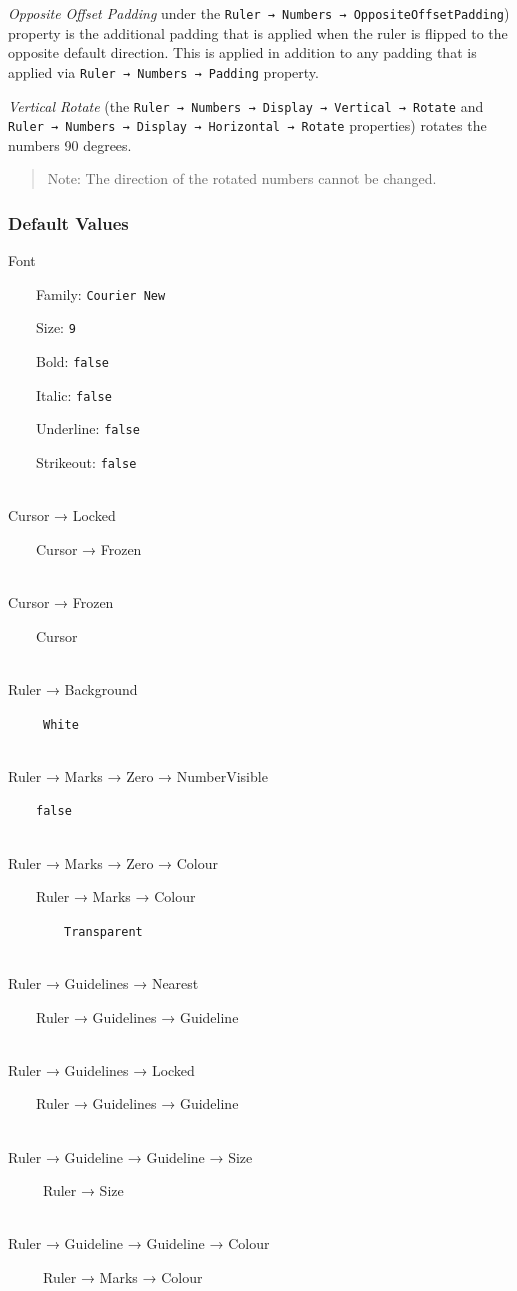 \documentclass[
]{book}
\begin{document}
\emph{Opposite Offset Padding} under the \texttt{Ruler\ →\ Numbers\ →\ OppositeOffsetPadding}) property is the additional padding that is applied when the ruler is flipped to the opposite default direction.
This is applied in addition to any padding that is applied via \texttt{Ruler\ →\ Numbers\ →\ Padding} property.

\emph{Vertical Rotate} (the \texttt{Ruler\ →\ Numbers\ →\ Display\ →\ Vertical\ →\ Rotate} and \texttt{Ruler\ →\ Numbers\ →\ Display\ →\ Horizontal\ →\ Rotate} properties) rotates the numbers 90 degrees.

\begin{quote}
Note: The direction of the rotated numbers cannot be changed.
\end{quote}

\subsubsection{Default Values}\label{default-values}

Font\\
\strut ~~~~Family: \texttt{Courier\ New}\\
\strut ~~~~Size: \texttt{9}\\
\strut ~~~~Bold: \texttt{false}\\
\strut ~~~~Italic: \texttt{false}\\
\strut ~~~~Underline: \texttt{false}\\
\strut ~~~~Strikeout: \texttt{false}\\
\strut \\
Cursor → Locked\\
\strut ~~~~Cursor → Frozen\\
\strut \\
Cursor → Frozen\\
\strut ~~~~Cursor\\
\strut \\
Ruler → Background\\
\strut ~~~~~\texttt{White}\\
\strut \\
Ruler → Marks → Zero → NumberVisible\\
\strut ~~~~\texttt{false}\\
\strut \\
Ruler → Marks → Zero → Colour\\
\strut ~~~~Ruler → Marks → Colour\\
\strut ~~~~~~~~\texttt{Transparent}\\
\strut \\
Ruler → Guidelines → Nearest\\
\strut ~~~~Ruler → Guidelines → Guideline\\
\strut \\
Ruler → Guidelines → Locked\\
\strut ~~~~Ruler → Guidelines → Guideline\\
\strut \\
Ruler → Guideline → Guideline → Size\\
\strut ~~~~~Ruler → Size\\
\strut \\
Ruler → Guideline → Guideline → Colour\\
\strut ~~~~~Ruler → Marks → Colour
\end{document}
